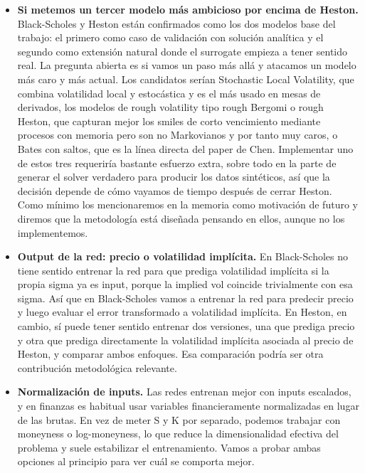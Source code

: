 \documentclass[11pt,a4paper]{article}
\begin{document}
\begin{itemize}
\item \textbf{Si metemos un tercer modelo más ambicioso por encima de Heston.} Black-Scholes y Heston están confirmados como los dos modelos base del trabajo: el primero como caso de validación con solución analítica y el segundo como extensión natural donde el surrogate empieza a tener sentido real. La pregunta abierta es si vamos un paso más allá y atacamos un modelo más caro y más actual. Los candidatos serían Stochastic Local Volatility, que combina volatilidad local y estocástica y es el más usado en mesas de derivados, los modelos de rough volatility tipo rough Bergomi o rough Heston, que capturan mejor los smiles de corto vencimiento mediante procesos con memoria pero son no Markovianos y por tanto muy caros, o Bates con saltos, que es la línea directa del paper de Chen. Implementar uno de estos tres requeriría bastante esfuerzo extra, sobre todo en la parte de generar el solver verdadero para producir los datos sintéticos, así que la decisión depende de cómo vayamos de tiempo después de cerrar Heston. Como mínimo los mencionaremos en la memoria como motivación de futuro y diremos que la metodología está diseñada pensando en ellos, aunque no los implementemos.

\item \textbf{Output de la red: precio o volatilidad implícita.} En Black-Scholes no tiene sentido entrenar la red para que prediga volatilidad implícita si la propia sigma ya es input, porque la implied vol coincide trivialmente con esa sigma. Así que en Black-Scholes vamos a entrenar la red para predecir precio y luego evaluar el error transformado a volatilidad implícita. En Heston, en cambio, sí puede tener sentido entrenar dos versiones, una que prediga precio y otra que prediga directamente la volatilidad implícita asociada al precio de Heston, y comparar ambos enfoques. Esa comparación podría ser otra contribución metodológica relevante.

\item \textbf{Normalización de inputs.} Las redes entrenan mejor con inputs escalados, y en finanzas es habitual usar variables financieramente normalizadas en lugar de las brutas. En vez de meter S y K por separado, podemos trabajar con moneyness o log-moneyness, lo que reduce la dimensionalidad efectiva del problema y suele estabilizar el entrenamiento. Vamos a probar ambas opciones al principio para ver cuál se comporta mejor.
\end{itemize}
\end{document}
